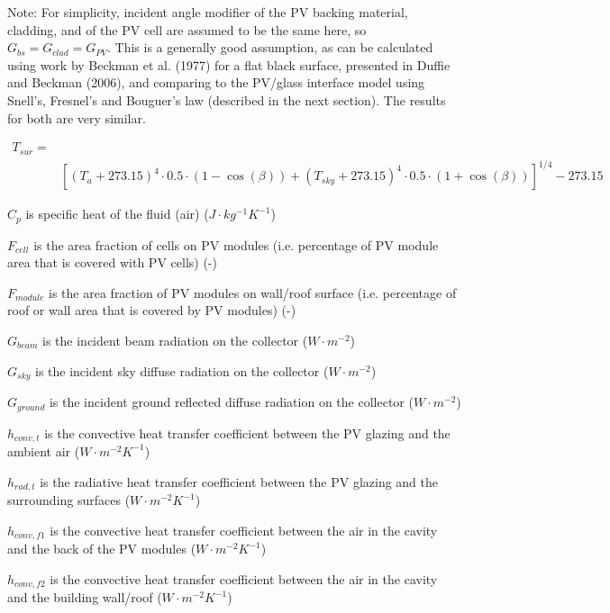 Note: For simplicity, incident angle modifier of the PV backing material, cladding, and of the PV cell are assumed to be the same here, so \(G_{bs} = G_{clad} = G_{PV}\). This is a generally good assumption, as can be calculated using work by Beckman et al. (1977) for a flat black surface, presented in Duffie and Beckman (2006), and comparing to the PV/glass interface model using Snell's, Fresnel's and Bouguer's law (described in the next section). The results for both are very similar.

\begin{equation}
\begin{split}
T_{sur}=\\ &\left[\left(T_{a}+273.15\right)^{4}\cdot 0.5 \cdot \left(1-\cos\left(\beta \right)\right)+\left(T_{sky}+273.15\right)^{4}\cdot 0.5 \cdot \left(1+\cos\left(\beta \right)\right)\right]^{1/4} - 273.15
\end{split}
\label{eq:BIPVT-T-sur}
\end{equation}

\(C_{p}\) is specific heat of the fluid (air) (\(J\cdot kg^{-1}K^{-1}\))

\(F_{cell}\) is the area fraction of cells on PV modules (i.e. percentage of PV module area that is covered with PV cells) (-)

\(F_{module}\) is the area fraction of PV modules on wall/roof surface (i.e. percentage of roof or wall area that is covered by PV modules) (-)

\(G_{beam}\) is the incident beam radiation on the collector (\(W\cdot m^{-2}\))

\(G_{sky}\) is the incident sky diffuse radiation on the collector (\(W\cdot m^{-2}\))

\(G_{ground}\) is the incident ground reflected diffuse radiation on the collector (\(W\cdot m^{-2}\))

\(h_{conv,t}\) is the convective heat transfer coefficient between the PV glazing and the ambient air (\(W\cdot m^{-2}K^{-1}\))

\(h_{rad,t}\) is the radiative heat transfer coefficient between the PV glazing and the surrounding surfaces (\(W\cdot m^{-2}K^{-1}\))

\(h_{conv,f1}\) is the convective heat transfer coefficient between the air in the cavity and the back of the PV modules (\(W\cdot m^{-2}K^{-1}\))

\(h_{conv,f2}\) is the convective heat transfer coefficient between the air in the cavity and the building wall/roof (\(W\cdot m^{-2}K^{-1}\))

